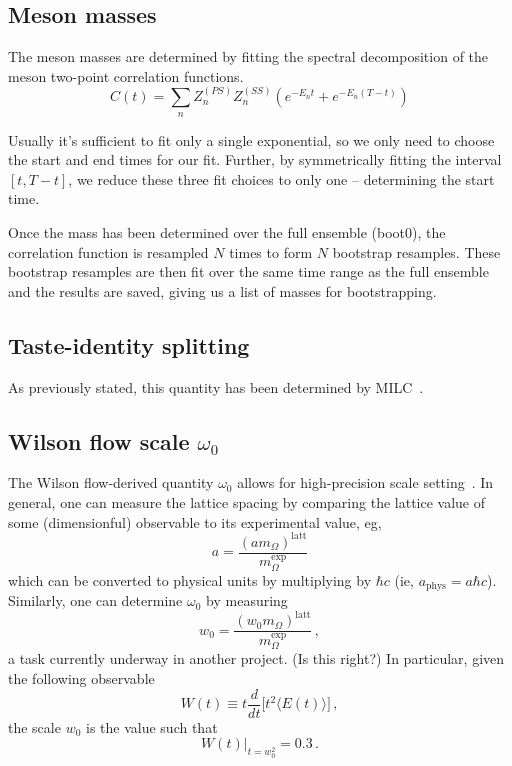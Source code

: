 \documentclass[prd,tightenlines,preprintnumbers,showpacs,superscriptaddress,notitlepage,eqsecnum,floatfix,notitlepage]{revtex4-1}
\begin{document}
\subsection{Meson masses}
The meson masses are determined by fitting the spectral decomposition of the meson two-point correlation functions.
\begin{equation}
C(t) = \sum_n Z^{(PS)}_{n} Z^{(SS)}_{n} \left( e^{-E_n t} + e^{-E_n (T-t)} \right)
\label{eqn:meson-correlation-fcn}
\end{equation}

Usually it's sufficient to fit only a single exponential, so we only need to choose the start and end times for our fit. Further, by symmetrically fitting the interval $[t, T - t]$, we reduce these three fit choices to only one -- determining the start time.

Once the mass has been determined over the full ensemble (boot0), the correlation function is resampled $N$ times to form $N$ bootstrap resamples. These bootstrap resamples are then fit over the same time range as the full ensemble and the results are saved, giving us a list of masses for bootstrapping.

\subsection{Taste-identity splitting}
As previously stated, this quantity has been determined by MILC~\cite{Bazavov:2012xda}.

\subsection{Wilson flow scale $\omega_0$}
The Wilson flow-derived quantity $\omega_0$ allows for high-precision scale setting~\cite{Borsanyi:2012zs}. In general, one can measure the lattice spacing by comparing the lattice value of some (dimensionful) observable to its experimental value, eg,
\begin{equation}
a = \frac{(a m_\Omega)^\text{latt}}{m_\Omega^\text{exp}}
\end{equation}
which can be converted to physical units by multiplying by $\hbar c$ (ie, $a_\text{phys} = a \hbar c$). Similarly, one can determine $\omega_0$ by measuring
\begin{equation}
w_0 = \frac{(w_0 m_\Omega)^\text{latt}}{m_\Omega^\text{exp}} \, ,
\end{equation}
a task currently underway in another project.  {\color{red} (Is this right?)} In particular, given the following observable
\begin{equation}
W(t) \equiv t \frac{d}{dt} \Big[ t^2 \langle E(t) \rangle \Big] \, ,
\end{equation}
the scale $w_0$ is the value such that
\begin{equation}
W(t) \Big|_{t=w_0^2} = 0.3 \, .
\end{equation}
\end{document}
